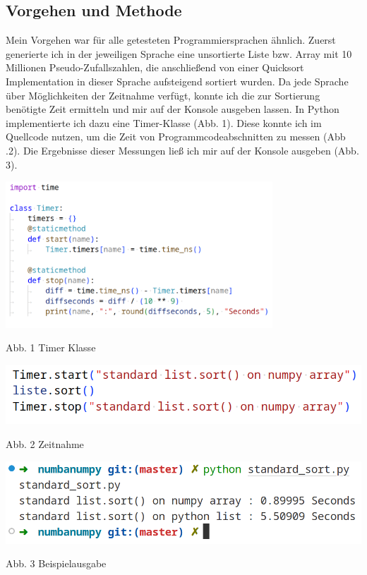 \documentclass[11pt,a4paper]{article}
\begin{document}
\subsection{Vorgehen und Methode}

Mein Vorgehen war für alle getesteten Programmiersprachen ähnlich.
Zuerst generierte ich in der jeweiligen Sprache eine unsortierte Liste bzw. Array mit 10 Millionen Pseudo-Zufallszahlen,
die anschließend von einer Quicksort Implementation in dieser Sprache aufsteigend sortiert wurden.
Da jede Sprache über Möglichkeiten der Zeitnahme verfügt, konnte ich die zur Sortierung benötigte Zeit
ermitteln und mir auf der Konsole ausgeben lassen. In Python implementierte ich dazu eine Timer-Klasse
(Abb. 1). Diese konnte ich im Quellcode nutzen, um die Zeit von Programmcodeabschnitten zu messen (Abb .2).
Die Ergebnisse dieser Messungen ließ ich mir auf der Konsole ausgeben (Abb. 3).

\begin{center}
    \includegraphics[width=0.75\textwidth]{screenshots/pythontimerlight.png}

    Abb. 1 Timer Klasse
\end{center}

\begin{center}
    \includegraphics[width=.75\textwidth]{screenshots/timerexamplelight.png}

    Abb. 2 Zeitnahme

    \includegraphics[width=.75\textwidth]{screenshots/outputexamplelight.png}

    Abb. 3 Beispielausgabe
\end{center}
\end{document}
